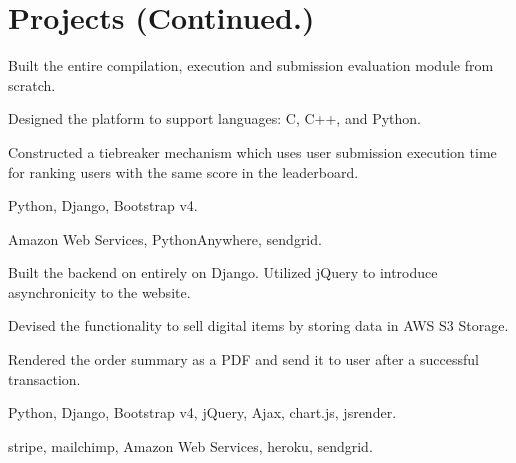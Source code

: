 \section{Projects \small{(Continued.)}}

 \vspace{0.1in}
\begin{tightemize}
\item Built the entire compilation, execution and submission evaluation module from scratch.
\item Designed the platform to support languages: C, C++, and Python.
\item Constructed a tiebreaker mechanism which uses user submission execution time for ranking users with the same score in the leaderboard.
\item {} Python, Django, Bootstrap v4.
\item {} Amazon Web Services, PythonAnywhere, sendgrid.
\end{tightemize}
\sectionsep

\begin{tightemize}
\item Built the backend on entirely on Django. Utilized jQuery to introduce asynchronicity to the website.
\item Devised the functionality to sell digital items by storing data in AWS S3 Storage.
\item Rendered the order summary as a PDF and send it to user after a successful transaction.
\item {} Python, Django, Bootstrap v4, jQuery, Ajax, chart.js, jsrender.
\item {} stripe, mailchimp, Amazon Web Services, heroku, sendgrid.
\end{tightemize}
\sectionsep

